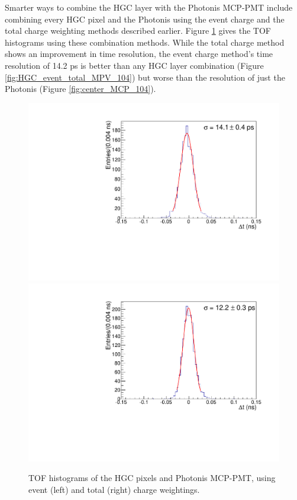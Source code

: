 \documentclass[twocolumn,aps,prd,reprint,superscriptaddress,floatfix]{revtex4-1}
\begin{document}
Smarter ways to combine the HGC layer with the Photonis MCP-PMT include combining every HGC pixel and the Photonis using the event charge and the total charge weighting methods described earlier.
Figure \ref{fig:HGC_MCP_event_total_104} gives the TOF histograms using these combination methods. 
While the total charge method shows an improvement in time resolution, the event charge method's time resolution of 14.2 ps is better than any HGC layer combination (Figure \ref{fig:HGC_event_total_MPV_104}) but worse than the resolution of just the Photonis (Figure \ref{fig:center_MCP_104}).

\begin{figure}[!htbp]
	\centering
	\includegraphics[width=.49\linewidth]{deltaT_PicoSil_MCP_EventCharge104.pdf}
	\includegraphics[width=.5\linewidth]{deltaT_PicoSil_MCP_TotalCharge104.pdf}
	\caption{TOF histograms of the HGC pixels and Photonis MCP-PMT, using event (left) and total (right) charge weightings.}
	\label{fig:HGC_MCP_event_total_104}
\end{figure}
\end{document}
